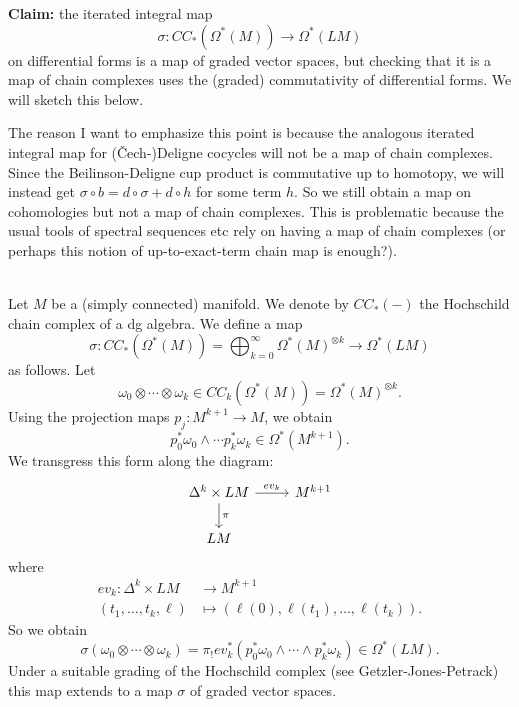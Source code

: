 \documentclass{amsart}
\begin{document}
\noindent\textbf{Claim:} the iterated integral map
\begin{equation*}
    \sigma: CC_*(\Omega^*(M)) \to \Omega^*(LM)
\end{equation*}
on differential forms is a map of graded vector spaces, but 
checking that it is a map of chain complexes uses the (graded) commutativity of 
differential forms. We will sketch this below.

The reason I want to emphasize this point is because
the analogous iterated integral map for (\v Cech-)Deligne cocycles will not be
a map of chain complexes. Since the Beilinson-Deligne cup product is commutative
up to homotopy, we will instead get $\sigma\circ b = d\circ\sigma + d\circ h$
for some term $h$. So we still obtain a map on cohomologies but not a map of 
chain complexes. This is problematic because the usual tools of spectral 
sequences etc rely on having a map of chain complexes (or perhaps this notion of 
up-to-exact-term chain map is enough?).


\hrulefill \\

Let $M$ be a (simply connected) manifold.
We denote by $CC_*(-)$ the Hochschild chain complex of a dg algebra.
We define a map
\begin{equation*}
    \sigma: CC_*(\Omega^*(M))=\bigoplus_{k=0}^\infty \Omega^*(M)^{\otimes k} \to 
    \Omega^*(LM)
\end{equation*}
as follows. Let
\begin{equation*}
    \omega_0\otimes \cdots \otimes \omega_k \in CC_k(\Omega^*(M)) = 
    \Omega^*(M)^{\otimes k}.
\end{equation*}
Using the projection maps $p_j: M^{k+1}\to M$, we obtain
\begin{equation*}
    p_0^*\omega_0 \wedge \cdots p_k^*\omega_k \in \Omega^*(M^{k+1}).
\end{equation*}
We transgress this form along the diagram:
\begin{equation*}
    \begin{tikzcd}
        \Delta^k \times LM \rar{ev_k}\dar{\pi} & M^{k+1} \\
        LM
    \end{tikzcd}
\end{equation*}
where
\begin{align*}
    ev_k : \Delta^k \times LM &\to M^{k+1} \\
    (t_1,\ldots, t_k, \ell) &\mapsto (\ell(0),\ell(t_1),\ldots,\ell(t_k)).
\end{align*}
So we obtain
\begin{equation*}
    \sigma(\omega_0\otimes\cdots\otimes\omega_k) =
    \pi_!ev_k^*(p_0^*\omega_0\wedge\cdots\wedge p_k^*\omega_k) \in \Omega^*(LM).
\end{equation*}
Under a suitable grading of the Hochschild complex (see Getzler-Jones-Petrack) 
this map extends to a map $\sigma$ of graded vector spaces.
\end{document}
